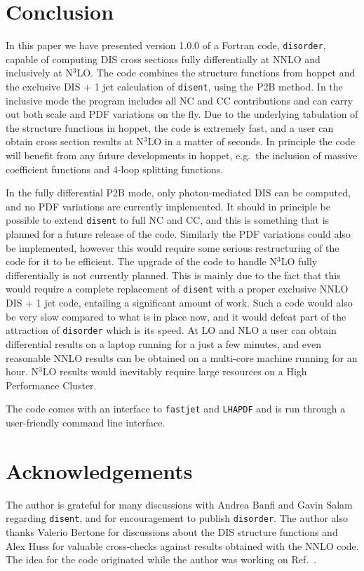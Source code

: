 \documentclass[submission, PhysCodeb]{SciPost}
\newcommand{\hoppet}{{\sc hoppet}}
\newcommand{\disent}{{\tt disent}}
\newcommand{\disorder}{{\tt disorder}}
\newcommand{\fastjet}{{\tt fastjet}}
\newcommand{\lhapdf}{{\tt LHAPDF}}
\newcommand{\nnlojet}{NNLO{\sc{jet}}}
\newcommand{\NNNLO}{N$^3$LO}
\begin{document}
\section{Conclusion}
\label{sec:conclusion}
In this paper we have presented version 1.0.0 of a Fortran code,
\disorder{}, capable of computing DIS cross sections fully
differentially at NNLO and inclusively at \NNNLO{}. The code combines
the structure functions from \hoppet{} and the exclusive DIS + 1 jet
calculation of \disent{}, using the P2B method. In the inclusive mode
the program includes all NC and CC contributions and can carry out
both scale and PDF variations on the fly. Due to the underlying
tabulation of the structure functions in \hoppet{}, the code is
extremely fast, and a user can obtain cross section results at
\NNNLO{} in a matter of seconds. In principle the code will benefit
from any future developments in \hoppet{}, e.g.~the inclusion of
massive coefficient functions and 4-loop splitting functions.

In the fully differential P2B mode, only photon-mediated DIS can be
computed, and no PDF variations are currently implemented. It should
in principle be possible to extend \disent{} to full NC and CC, and
this is something that is planned for a future release of the
code. Similarly the PDF variations could also be implemented, however
this would require some serious restructuring of the code for it to be
efficient. The upgrade of the code to handle \NNNLO{} fully
differentially is not currently planned. This is mainly due to the
fact that this would require a complete replacement of \disent{} with
a proper exclusive NNLO DIS + 1 jet code, entailing a significant
amount of work. Such a code would also be very slow compared to what
is in place now, and it would defeat part of the attraction of
\disorder{} which is its speed. At LO and NLO a user can obtain
differential results on a laptop running for a just a few minutes, and
even reasonable NNLO results can be obtained on a multi-core machine
running for an hour. \NNNLO{} results would inevitably require
large resources on a High Performance Cluster.

The code comes with an interface to \fastjet{} and \lhapdf{} and
is run through a user-friendly command line interface. 

\section*{Acknowledgements}
The author is grateful for many discussions with Andrea Banfi and
Gavin Salam regarding \disent{}, and for encouragement to publish
\disorder{}. The author also thanks Valerio Bertone for discussions
about the DIS structure functions and Alex Huss for valuable cross-checks
against results obtained with the \nnlojet{} code. The idea for the
code originated while the author was working on
Ref.~\cite{Banfi:2023mhz}.


%
%



\nolinenumbers
\end{document}
